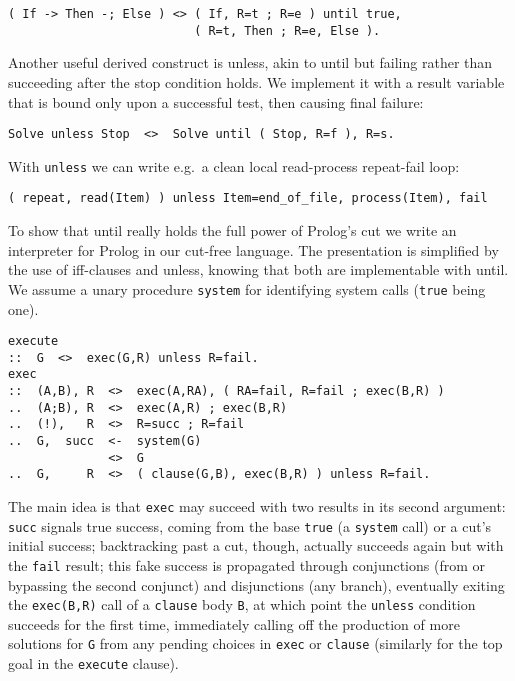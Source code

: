\documentclass{tlp}
\begin{document}
\vspace{-3.7pt}
\begin{verbatim}
( If -> Then -; Else ) <> ( If, R=t ; R=e ) until true,
                          ( R=t, Then ; R=e, Else ).
\end{verbatim}
\vspace{-3.7pt}

Another useful derived construct is \textsf{unless}, akin to
\textsf{until} but failing rather than succeeding after the stop
condition holds. We implement it with a result variable
that is bound only upon a successful test, then causing final failure:

\vspace{-3.7pt}
\begin{verbatim}
Solve unless Stop  <>  Solve until ( Stop, R=f ), R=s.
\end{verbatim}
\vspace{-3.7pt}
With \texttt{unless} we can write e.g.\ a clean local read-process
repeat-fail loop:

\vspace{-3.7pt}
\begin{verbatim}
( repeat, read(Item) ) unless Item=end_of_file, process(Item), fail
\end{verbatim}
\vspace{-3.7pt}

To show that \textsf{until} really holds the full power of Prolog's cut we write
an interpreter for Prolog in our cut-free language. The presentation is
simplified by the use of iff-clauses and \textsf{unless}, knowing that both are
implementable with \textsf{until}. We assume a unary procedure \verb+system+ for
identifying system calls (\verb+true+ being one).

\vspace{-3.7pt}
\begin{verbatim}
execute
::  G  <>  exec(G,R) unless R=fail.
exec
::  (A,B), R  <>  exec(A,RA), ( RA=fail, R=fail ; exec(B,R) )
..  (A;B), R  <>  exec(A,R) ; exec(B,R)
..  (!),   R  <>  R=succ ; R=fail
..  G,  succ  <-  system(G)
              <>  G
..  G,     R  <>  ( clause(G,B), exec(B,R) ) unless R=fail.
\end{verbatim}
\vspace{-3.7pt}
\noindent The main idea is that \texttt{exec} may succeed with two results in its
second argument: \texttt{succ} signals true success, coming from the base
\texttt{true} (a \texttt{system} call) or a cut's initial success; backtracking
past a cut, though, actually succeeds again but with the \texttt{fail} result;
this fake success is propagated through conjunctions (from or bypassing the
second conjunct) and disjunctions (any branch), eventually exiting the
\texttt{exec(B,R)} call of a \texttt{clause} body \texttt{B}, at which point
the \texttt{unless} condition succeeds for the first time, immediately calling
off the production of more solutions for \texttt{G} from any pending choices in
\texttt{exec} or \texttt{clause} (similarly for the top goal in the
\texttt{execute} clause).
\end{document}
